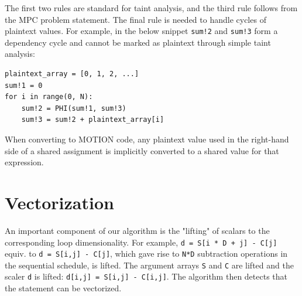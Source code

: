 \documentclass[sigconf, screen, natbib=false, dvipsnames, table]{acmart}
\theoremstyle{definition}
\begin{document}
The first two rules are standard for taint analysis, and the third rule follows from the MPC problem statement.   The final rule is needed to handle cycles of plaintext values.  For example, in the below snippet \texttt{sum!2} and \texttt{sum!3} form a dependency cycle and cannot be marked as plaintext through simple taint analysis:
{\small
\begin{verbatim}
plaintext_array = [0, 1, 2, ...]
sum!1 = 0
for i in range(0, N):
    sum!2 = PHI(sum!1, sum!3)
    sum!3 = sum!2 + plaintext_array[i]
\end{verbatim}
}

When converting to MOTION code, any plaintext value used in the right-hand side of a shared assignment is implicitly converted to a shared value for that expression. 

\section{Vectorization}
\label{sec:vectorization}

An important component of our algorithm is the "lifting" of scalars to the corresponding loop dimensionality. 
For example, \texttt{d = S[i * D + j] - C[j]} equiv. to \texttt{d = S[i,j] - C[j]}, which gave rise to \texttt{N*D} subtraction operations in the sequential schedule, 
is lifted. The argument arrays \texttt{S} and \texttt{C} are lifted and the scaler \texttt{d} is lifted: \texttt{d[i,j] = S[i,j] - C[i,j]}.
The algorithm then detects that the statement can be vectorized. 
\end{document}

